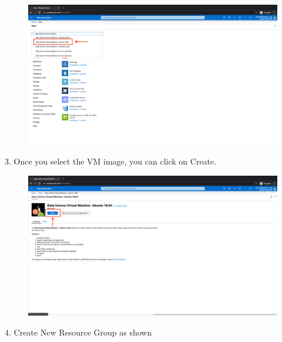 \begin{figure}[H]
\begin{center} 
\includegraphics[scale=0.20]{figures/vm2}
\end{center}
\end{figure}

3. Once you select the VM image, you can click on Create.

\begin{figure}[H]
\begin{center} 
\includegraphics[scale=0.20]{figures/vm3}
\end{center}
\end{figure}

4. Create New Resource Group as shown

